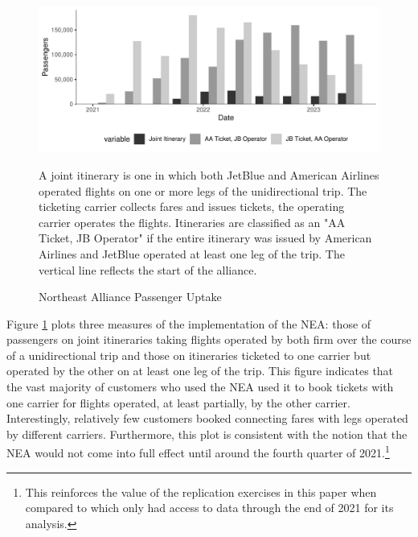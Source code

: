 \documentclass{article}
\begin{document}

    \begin{figure}
        \caption{Northeast Alliance Passenger Uptake}
        \label{fig:NEA_Uptake}
        \begin{center}
            \includegraphics[width = \linewidth]{05.Figures/NEA_OperationsGraph}
        \end{center}
        \vspace{-8mm}
        \footnotesize{A joint itinerary is one in which both JetBlue and American Airlines operated flights on one or more legs of the unidirectional trip. The ticketing carrier collects fares and issues tickets, the operating carrier operates the flights. Itineraries are classified as an "AA Ticket, JB Operator" if the entire itinerary was issued by American Airlines and JetBlue operated at least one leg of the trip. The vertical line reflects the start of the alliance. }
    \end{figure}

    Figure \ref{fig:NEA_Uptake} plots three measures of the implementation of the NEA: those of passengers on joint itineraries taking flights operated by both firm over the course of a unidirectional trip and those on itineraries ticketed to one carrier but operated by the other on at least one leg of the trip. This figure indicates that the vast majority of customers who used the NEA used it to book tickets with one carrier for flights operated, at least partially, by the other carrier. Interestingly, relatively few customers booked connecting fares with legs operated by different carriers. Furthermore, this plot is consistent with the notion that the NEA would not come into full effect until around the fourth quarter of 2021.\footnote{This reinforces the value of the replication exercises in this paper when compared to \citet{zou_assessing_2023} which only had access to data through the end of 2021 for its analysis.} 
    
\end{document}
